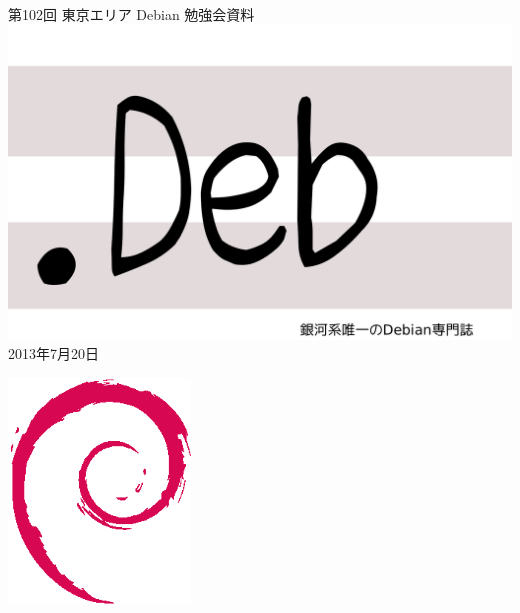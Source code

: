 \documentclass[mingoth,a4paper]{jsarticle}
\newcommand{\debmtgyear}{2013}
\newcommand{\debmtgmonth}{7}
\newcommand{\debmtgdate}{20}
\newcommand{\debmtgnumber}{102}
\begin{document}
\begin{titlepage}
\thispagestyle{empty}

\vspace*{-2cm}
第\debmtgnumber{}回 東京エリア Debian 勉強会資料\\
\hspace*{-2cm}
\includegraphics{image2012-natsu/dotdeb.pdf}\\
\hfill{}\debmtgyear{}年\debmtgmonth{}月\debmtgdate{}日



\vspace*{-2cm}
\hfill{}\includegraphics[height=6cm]{image200502/openlogo-nd.eps}
\end{titlepage}

\end{document}
